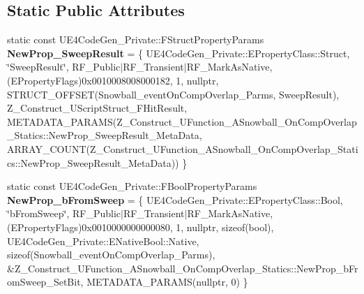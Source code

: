 \subsection*{Static Public Attributes}
\begin{DoxyCompactItemize}
\item 
\mbox{\label{struct_z___construct___u_function___a_snowball___on_comp_overlap___statics_afe05b0d1e0f5c2270019c530be3cc72f}} 
static const U\+E4\+Code\+Gen\+\_\+\+Private\+::\+F\+Struct\+Property\+Params {\bfseries New\+Prop\+\_\+\+Sweep\+Result} = \{ U\+E4\+Code\+Gen\+\_\+\+Private\+::\+E\+Property\+Class\+::\+Struct, \char`\"{}Sweep\+Result\char`\"{}, R\+F\+\_\+\+Public$\vert$R\+F\+\_\+\+Transient$\vert$R\+F\+\_\+\+Mark\+As\+Native, (E\+Property\+Flags)0x0010008008000182, 1, nullptr, S\+T\+R\+U\+C\+T\+\_\+\+O\+F\+F\+S\+E\+T(\+Snowball\+\_\+event\+On\+Comp\+Overlap\+\_\+\+Parms, Sweep\+Result), Z\+\_\+\+Construct\+\_\+\+U\+Script\+Struct\+\_\+\+F\+Hit\+Result, M\+E\+T\+A\+D\+A\+T\+A\+\_\+\+P\+A\+R\+A\+M\+S(\+Z\+\_\+\+Construct\+\_\+\+U\+Function\+\_\+\+A\+Snowball\+\_\+\+On\+Comp\+Overlap\+\_\+\+Statics\+::\+New\+Prop\+\_\+\+Sweep\+Result\+\_\+\+Meta\+Data, A\+R\+R\+A\+Y\+\_\+\+C\+O\+U\+N\+T(\+Z\+\_\+\+Construct\+\_\+\+U\+Function\+\_\+\+A\+Snowball\+\_\+\+On\+Comp\+Overlap\+\_\+\+Statics\+::\+New\+Prop\+\_\+\+Sweep\+Result\+\_\+\+Meta\+Data)) \}
\item 
\mbox{\label{struct_z___construct___u_function___a_snowball___on_comp_overlap___statics_af940c3dec051cbc1e855c7ebb9e07b5f}} 
static const U\+E4\+Code\+Gen\+\_\+\+Private\+::\+F\+Bool\+Property\+Params {\bfseries New\+Prop\+\_\+b\+From\+Sweep} = \{ U\+E4\+Code\+Gen\+\_\+\+Private\+::\+E\+Property\+Class\+::\+Bool, \char`\"{}b\+From\+Sweep\char`\"{}, R\+F\+\_\+\+Public$\vert$R\+F\+\_\+\+Transient$\vert$R\+F\+\_\+\+Mark\+As\+Native, (E\+Property\+Flags)0x0010000000000080, 1, nullptr, sizeof(bool), U\+E4\+Code\+Gen\+\_\+\+Private\+::\+E\+Native\+Bool\+::\+Native, sizeof(\+Snowball\+\_\+event\+On\+Comp\+Overlap\+\_\+\+Parms), \&\+Z\+\_\+\+Construct\+\_\+\+U\+Function\+\_\+\+A\+Snowball\+\_\+\+On\+Comp\+Overlap\+\_\+\+Statics\+::\+New\+Prop\+\_\+b\+From\+Sweep\+\_\+\+Set\+Bit, M\+E\+T\+A\+D\+A\+T\+A\+\_\+\+P\+A\+R\+A\+M\+S(nullptr, 0) \}
\item 
\mbox{\label{struct_z___construct___u_function___a_snowball___on_comp_overlap___statics_ace0112a51838337fab05fab099714f54}} 

\end{DoxyCompactItemize}
